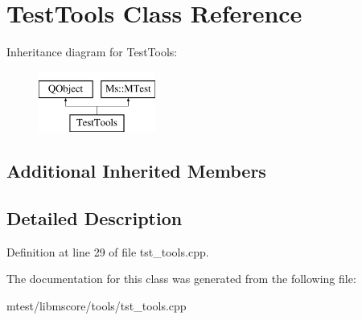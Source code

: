 \hypertarget{class_test_tools}{}\section{Test\+Tools Class Reference}
\label{class_test_tools}
Inheritance diagram for Test\+Tools\+:\begin{figure}[H]
\begin{center}
\leavevmode
\includegraphics[height=2.000000cm]{class_test_tools}
\end{center}
\end{figure}
\subsection*{Additional Inherited Members}


\subsection{Detailed Description}


Definition at line 29 of file tst\+\_\+tools.\+cpp.



The documentation for this class was generated from the following file\+:\begin{DoxyCompactItemize}
\item 
mtest/libmscore/tools/tst\+\_\+tools.\+cpp\end{DoxyCompactItemize}
